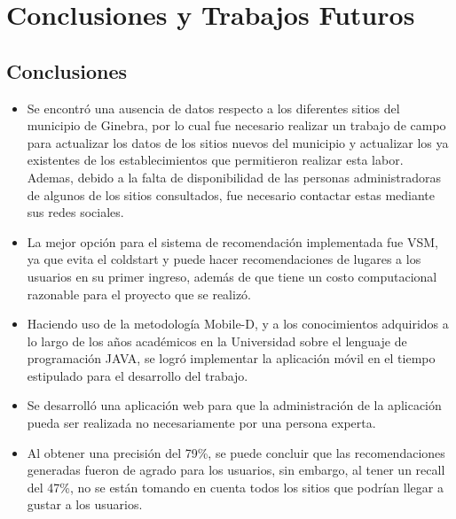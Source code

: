 \documentclass[12pt,letterpaper,openany]{book}
\begin{document}
\chapter{Conclusiones y Trabajos Futuros}\label{cap.conclu_trabajos}
\section{Conclusiones}
\begin{itemize}
    \item Se encontró una ausencia de datos respecto a los diferentes sitios del municipio de
Ginebra, por lo cual fue necesario realizar un trabajo de campo para actualizar los
datos de los sitios nuevos del municipio y actualizar los ya existentes de los establecimientos que permitieron realizar esta labor.\\
Ademas, debido a la falta de disponibilidad de las personas administradoras de algunos de los sitios consultados, fue necesario contactar estas mediante sus redes sociales.
\item La mejor opción para el sistema de recomendación implementada fue VSM, ya que evita el coldstart y puede hacer recomendaciones de lugares a los usuarios en su primer ingreso, además de que tiene un costo computacional razonable para el proyecto que se realizó.
\item Haciendo uso de la metodología Mobile-D, y a los conocimientos adquiridos a lo largo de los años académicos en la Universidad sobre el lenguaje de programación JAVA, se logró implementar la aplicación móvil en el tiempo estipulado para el desarrollo del trabajo.
\item Se desarrolló una aplicación web para que la administración de la aplicación pueda ser realizada no necesariamente por una persona experta.
   \item Al obtener una precisión del 79\%, se puede concluir que las recomendaciones generadas fueron de agrado para los usuarios, sin embargo, al tener un recall del 47\%, no se están tomando en cuenta todos los sitios que podrían llegar a gustar a los usuarios.
\end{itemize}
\end{document}
